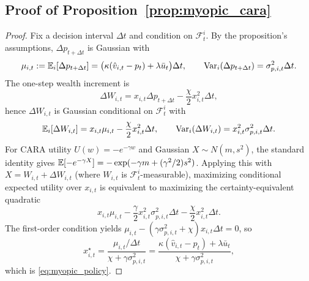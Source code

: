 \subsection*{Proof of Proposition~\ref{prop:myopic_cara}}
\begin{proof}
Fix a decision interval $\Delta t$ and condition on $\mathcal F_t^i$.
By the proposition's assumptions, $\Delta p_{t+\Delta t}$ is Gaussian with
\[
\mu_{i,t}:=\mathbb{E}_i[\Delta p_{t+\Delta t}]=\big(\kappa(\hat v_{i,t}-p_t)+\lambda\bar u_t\big)\Delta t,
\qquad
\text{Var}_i(\Delta p_{t+\Delta t})=\sigma^2_{p,i,t}\Delta t.
\]
The one-step wealth increment is
\[
\Delta W_{i,t}=x_{i,t}\Delta p_{t+\Delta t}-\frac{\chi}{2}x_{i,t}^2\Delta t,
\]
hence $\Delta W_{i,t}$ is Gaussian conditional on $\mathcal F_t^i$ with
\[
\mathbb{E}_i[\Delta W_{i,t}]=x_{i,t}\mu_{i,t}-\frac{\chi}{2}x_{i,t}^2\Delta t,
\qquad
\text{Var}_i(\Delta W_{i,t})=x_{i,t}^2\sigma^2_{p,i,t}\Delta t.
\]
For CARA utility $U(w)=-e^{-\gamma w}$ and Gaussian $X\sim N(m,s^2)$, the standard identity gives
$\mathbb{E}[-e^{-\gamma X}]=-\exp(-\gamma m+(\gamma^2/2)s^2)$.
Applying this with $X=W_{i,t}+\Delta W_{i,t}$ (where $W_{i,t}$ is $\mathcal F_t^i$-measurable),
maximizing conditional expected utility over $x_{i,t}$ is equivalent to maximizing the certainty-equivalent quadratic
\[
x_{i,t}\mu_{i,t}-\frac{\gamma}{2}x_{i,t}^2\sigma^2_{p,i,t}\Delta t-\frac{\chi}{2}x_{i,t}^2\Delta t.
\]
The first-order condition yields
$\mu_{i,t}-(\gamma\sigma^2_{p,i,t}+\chi)x_{i,t}\Delta t=0$, so
\[
x^\star_{i,t}=\frac{\mu_{i,t}/\Delta t}{\chi+\gamma\sigma^2_{p,i,t}}
=\frac{\kappa(\hat v_{i,t}-p_t)+\lambda\bar u_t}{\chi+\gamma\sigma^2_{p,i,t}},
\]
which is \eqref{eq:myopic_policy}.
\end{proof}

